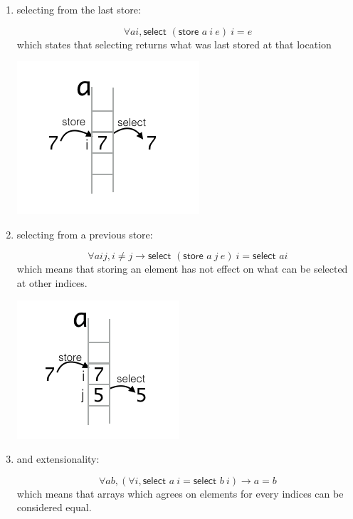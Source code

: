 \documentclass[onecolumn, preprint]{sigplanconf}
\begin{document}
\begin{enumerate}
\item selecting from the last store:
  \begin{multicols}{2}
    
  $$ \forall a i, \textsf{select } (\textsf{store } a\ i\ e)\ i = e$$
which states that selecting returns what was last stored at that location
 
\includegraphics[scale=0.5]{pictures/axiom1.png}

  \end{multicols}
  
\item selecting from a previous store:
  \begin{multicols}{2}
  $$ \forall a i j, i \neq j \to \textsf{select } (\textsf{store } a\ j\ e)\ i = \textsf{select } a i$$
  which means that storing an element has not effect on what can be selected at other indices.

  \includegraphics[scale=0.5]{pictures/axiom2.png}
  \end{multicols}
  
\item and extensionality:
  
  \begin{multicols}{2}
  $$ \forall a b, (\forall i, \textsf{select } a\ i = \textsf{select } b\ i) \to a = b$$
  which means that arrays which agrees on elements for every indices can be considered equal.


\end{multicols}
\end{enumerate}
\end{document}
